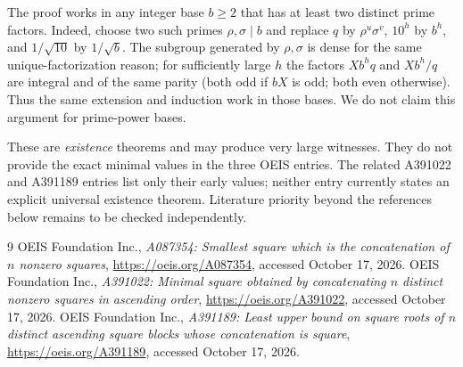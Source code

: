 \documentclass[9pt]{extarticle}
\begin{document}
The proof works in any integer base $b\ge2$ that has at least
two distinct prime factors. Indeed, choose two such primes
$\rho,\sigma\mid b$ and replace $q$ by $\rho^u\sigma^v$, $10^h$
by $b^h$, and $1/\sqrt{10}$ by $1/\sqrt b$. The subgroup generated by
$\rho,\sigma$ is dense for the same unique-factorization reason;
for sufficiently large $h$ the factors $Xb^hq$ and $Xb^h/q$
are integral and of the same parity (both odd if $bX$ is odd;
both even otherwise). Thus the same extension and induction work
in those bases. We do not claim this argument for prime-power bases.

These are \emph{existence} theorems and may produce very large
witnesses. They do not provide the exact minimal
values in the three OEIS entries. The related A391022 and A391189 entries
list only their early values; neither entry currently states
an explicit universal existence theorem. Literature priority
beyond the references below remains to be checked independently.

\begin{thebibliography}{9}
 OEIS Foundation Inc.,
\emph{A087354: Smallest square which is the concatenation of $n$
nonzero squares}, \url{https://oeis.org/A087354}, accessed October 17, 2026.
 OEIS Foundation Inc.,
\emph{A391022: Minimal square obtained by concatenating $n$ distinct
nonzero squares in ascending order}, \url{https://oeis.org/A391022},
accessed October 17, 2026.
 OEIS Foundation Inc.,
\emph{A391189: Least upper bound on square roots of $n$ distinct
ascending square blocks whose concatenation is square},
\url{https://oeis.org/A391189}, accessed October 17, 2026.
\end{thebibliography}
\end{document}
